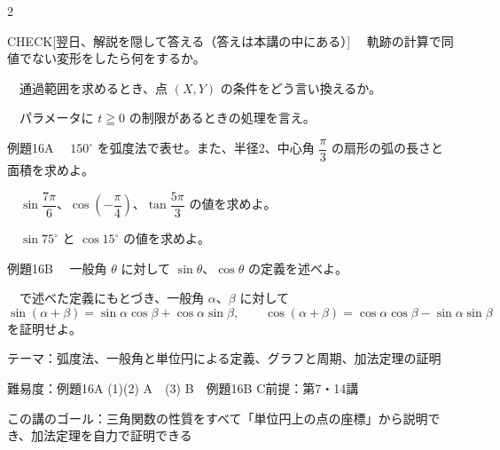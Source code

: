 \documentclass[paper=b5j, fontsize=8pt, fleqn, twoside]{jlreq}
\begin{document}
\begin{multicols*}{2}
  \begin{ptbs}{CHECK}[翌日、解説を隠して答える（答えは本講の中にある）]
    　軌跡の計算で同値でない変形をしたら何をするか。\par
    　通過範囲を求めるとき、点 $(X,Y)$ の条件をどう言い換えるか。\par
    　パラメータに $t\geqq0$ の制限があるときの処理を言え。
  \end{ptbs}

  \notefill
\end{multicols*}

\begin{ascolorbox4A}[出典：オリジナル]{例題16A}
  　$150^\circ$ を弧度法で表せ。また、半径2、中心角 $\dfrac\pi3$ の扇形の弧の長さと面積を求めよ。\par
  　$\sin\dfrac{7\pi}6$、$\cos\left(-\dfrac\pi4\right)$、$\tan\dfrac{5\pi}3$ の値を求めよ。\par
  　$\sin75^\circ$ と $\cos15^\circ$ の値を求めよ。
\end{ascolorbox4A}

\begin{ascolorbox4A}[出典：東京大学 1999年度]{例題16B}
  　一般角 $\theta$ に対して $\sin\theta$、$\cos\theta$ の定義を述べよ。\par
  　で述べた定義にもとづき、一般角 $\alpha$、$\beta$ に対して
  \[\sin(\alpha+\beta)=\sin\alpha\cos\beta+\cos\alpha\sin\beta,\qquad\cos(\alpha+\beta)=\cos\alpha\cos\beta-\sin\alpha\sin\beta\]
  を証明せよ。
\end{ascolorbox4A}

\begin{Data}
  テーマ：弧度法、一般角と単位円による定義、グラフと周期、加法定理の証明\par
  難易度：例題16A (1)(2) A　(3) B　例題16B C\quad 前提：第7・14講\par
  この講のゴール：三角関数の性質をすべて「単位円上の点の座標」から説明でき、加法定理を自力で証明できる
\end{Data}
\end{document}
